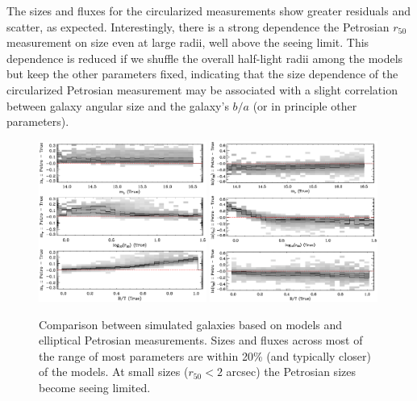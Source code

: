 \documentclass[10pt,preprint]{aastex}
\newcounter{thefigs}
\newcommand{\fignum}{\arabic{thefigs}}
\begin{document}
The sizes and fluxes for the circularized measurements show greater
residuals and scatter, as expected. Interestingly, there is a strong
dependence the Petrosian $r_{50}$ measurement on size even at large
radii, well above the seeing limit. This dependence is reduced if we
shuffle the overall half-light radii among the models but keep the
other parameters fixed, indicating that the size dependence of the
circularized Petrosian measurement may be associated with a slight
correlation between galaxy angular size and the galaxy's $b/a$ (or in
principle other parameters).
 
\begin{figure} 
\figurenum{\fignum}
\includegraphics[width=0.49\textwidth]{test-simard-petro-flux-vA.ps} \quad
\includegraphics[width=0.49\textwidth]{test-simard-petro-r50-vA.ps} 
\caption{\label{fig:petro} Comparison between simulated galaxies based
  on \citet{simard11a} models and elliptical Petrosian
  measurements. Sizes and fluxes across most of the range of most
  parameters are within 20\% (and typically closer) of the models. At
  small sizes ($r_{50} < 2$ arcsec) the Petrosian sizes become seeing
  limited. }
\end{figure}
\end{document}

